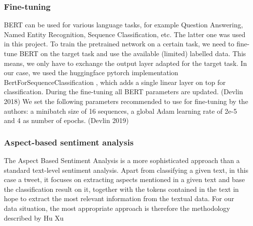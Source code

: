 
\subsubsection{Fine-tuning}
\label{bert_fine}

BERT can be used for various language tasks, for example Question Answering, 
Named Entity Recognition, Sequence Classification, etc. The latter one was used 
in this project. To train the pretrained network on a certain task, we need to 
fine-tune BERT on the target task and use the available (limited) labelled data. 
This means, we only have to exchange the output layer adapted for the target 
task. In our case, we used the huggingface pytorch implementation 
BertForSequenceClassification 
, which adds a single linear layer on top for classification.  During the 
fine-tuning all BERT parameters are updated. (Devlin 2018) We set the following 
parameters recommended to use for fine-tuning by the authors: a minibatch size 
of 16 sequences, a global Adam learning rate of 2e-5 and 4 as number of epochs. 
(Devlin 2019)


\subsubsection{Aspect-based sentiment analysis}
\label{bert_absa}

The Aspect Based Sentiment Analysis is a more sophisticated approach than a 
standard text-level sentiment analysis. Apart from classifying a given text, in 
this case a tweet, it focuses on extracting aspects mentioned in a given text 
and base the classification result on it, together with the tokens contained in 
the text in hope to extract the most relevant information from the textual data. 
For our data situation, the most appropriate approach is therefore the 
methodology described by Hu Xu 

